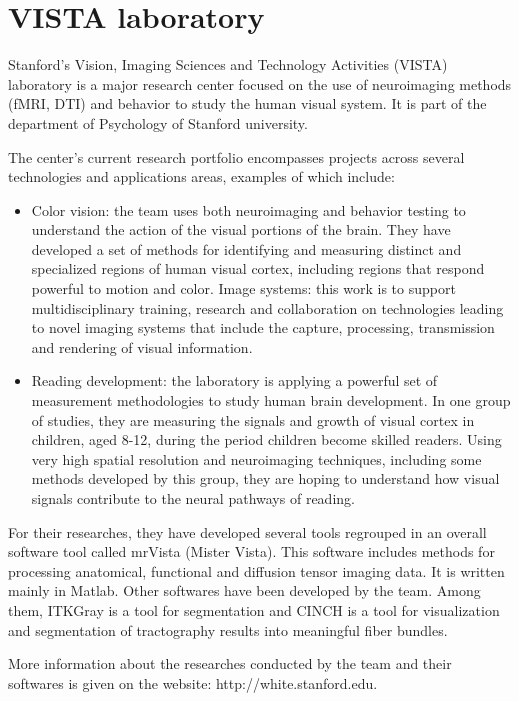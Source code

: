 \section{VISTA laboratory}
Stanford’s Vision, Imaging Sciences and Technology Activities (VISTA) laboratory is a major research center focused on the use of neuroimaging methods (fMRI, DTI) and behavior to study the human visual system. It is part of the department of Psychology of  Stanford university.
\par
The center’s current research portfolio encompasses projects across several technologies and applications areas, examples of which include:
\begin{itemize}
\item Color vision: the team uses both neuroimaging and behavior testing to understand the action of the visual portions of the brain. They have developed a set of methods for identifying and measuring distinct and specialized regions of human visual cortex, including regions that respond powerful to motion and color.
Image systems: this work is to support multidisciplinary training, research and collaboration on technologies leading to novel imaging systems that include the capture, processing, transmission and rendering of visual information.
\item Reading development: the laboratory is applying a powerful set of measurement methodologies to study human brain development. In one group of studies, they are measuring the signals and growth of visual cortex in children, aged 8-12, during the period children become skilled readers. Using very high spatial resolution and neuroimaging techniques, including some methods developed by this group, they are hoping to understand how visual signals contribute to the neural pathways of reading.
\end{itemize}
\par
For their researches, they have developed several tools regrouped in an overall software tool called mrVista (Mister Vista). This software includes methods for processing anatomical, functional and diffusion tensor imaging data. It is written mainly in Matlab. Other softwares have been developed by the team. Among them, ITKGray is a tool for segmentation and CINCH is a tool for visualization and segmentation of tractography results into meaningful fiber bundles.
\par
More information about the researches conducted by the team and their softwares is given on the website: http://white.stanford.edu. 

